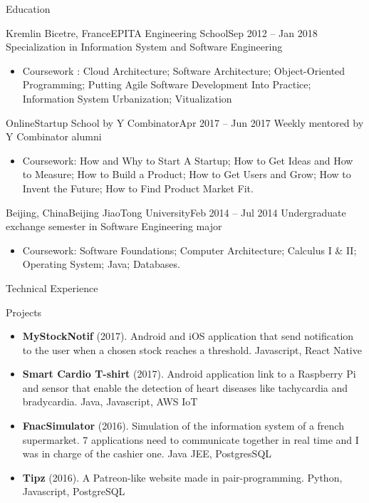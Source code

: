 \documentclass[]{mcdowellcv}
\begin{document}
	
	\begin{cvsection}{Education}
		\begin{cvsubsection}{Kremlin Bicetre, France}{EPITA Engineering School}{Sep 2012 -- Jan 2018}
		Specialization in Information System and Software Engineering
			\begin{itemize}
				\item Coursework : Cloud Architecture; Software Architecture; Object-Oriented Programming; Putting Agile Software Development Into Practice; Information System Urbanization; Vitualization
			\end{itemize}
		\end{cvsubsection}

		\begin{cvsubsection}{Online}{Startup School by Y Combinator}{Apr 2017 -- Jun 2017}
		Weekly mentored by Y Combinator alumni
			\begin{itemize}
				\item Coursework: How and Why to Start A Startup; How to Get Ideas and How to Measure; How to Build a Product; How to Get Users and Grow; How to Invent the Future; How to Find Product Market Fit.
			\end{itemize}
		\end{cvsubsection}
		
		\begin{cvsubsection}{Beijing, China}{Beijing JiaoTong University}{Feb 2014 -- Jul 2014}
			Undergraduate exchange semester in Software Engineering major
			\begin{itemize}
				\item Coursework: Software Foundations; Computer Architecture; Calculus I \& II; Operating System; Java; Databases.
			\end{itemize}
		\end{cvsubsection}
	\end{cvsection}
	
	\begin{cvsection}{Technical Experience}
		\begin{cvsubsection}{Projects}{}{}
			\begin{itemize}
				\item \textbf{MyStockNotif} (2017). Android and iOS application that send notification to the user when a chosen stock reaches a threshold. Javascript, React Native
				\item \textbf{Smart Cardio T-shirt} (2017). Android application link to a Raspberry Pi and sensor that enable the detection of heart diseases like tachycardia and bradycardia. Java, Javascript, AWS IoT
				\item \textbf{FnacSimulator} (2016). Simulation of the information system of a french supermarket. 7 applications need to communicate together in real time and I was in charge of the cashier one. Java JEE, PostgresSQL
				\item \textbf{Tipz} (2016). A Patreon-like website made in pair-programming. Python, Javascript, PostgreSQL
			\end{itemize}
		\end{cvsubsection}
	\end{cvsection}
	
\end{document}
